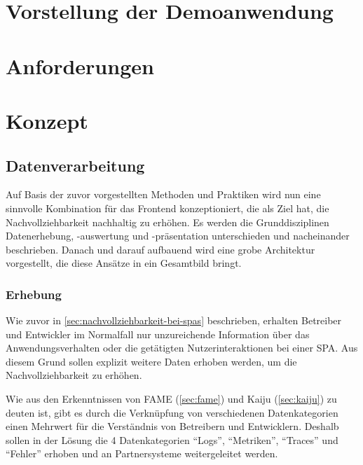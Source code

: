 	
\section{Vorstellung der Demoanwendung}

	
\section{Anforderungen}

	
\section{Konzept}
	
	\subsection{Datenverarbeitung}

	Auf Basis der zuvor vorgestellten Methoden und Praktiken wird nun eine sinnvolle Kombination für das Frontend konzeptioniert, die als Ziel hat, die Nachvollziehbarkeit nachhaltig zu erhöhen. Es werden die Grunddisziplinen Datenerhebung, -auswertung und -präsentation unterschieden und nacheinander beschrieben. Danach und darauf aufbauend wird eine grobe Architektur vorgestellt, die diese Ansätze in ein Gesamtbild bringt.
		
	\subsubsection{Erhebung}
	
	Wie zuvor in \autoref{sec:nachvollziehbarkeit-bei-spas} beschrieben, erhalten Betreiber und Entwickler im Normalfall nur unzureichende Information über das Anwendungsverhalten oder die getätigten Nutzerinteraktionen bei einer SPA. Aus diesem Grund sollen explizit weitere Daten erhoben werden, um die Nachvollziehbarkeit zu erhöhen.
	
	Wie aus den Erkenntnissen von FAME (\autoref{sec:fame}) und Kaiju (\autoref{sec:kaiju}) zu deuten ist, gibt es durch die Verknüpfung von verschiedenen Datenkategorien einen Mehrwert für die Verständnis von Betreibern und Entwicklern. Deshalb sollen in der Lösung die 4 Datenkategorien \enquote{Logs}, \enquote{Metriken}, \enquote{Traces} und \enquote{Fehler} erhoben und an Partnersysteme weitergeleitet werden.
	
